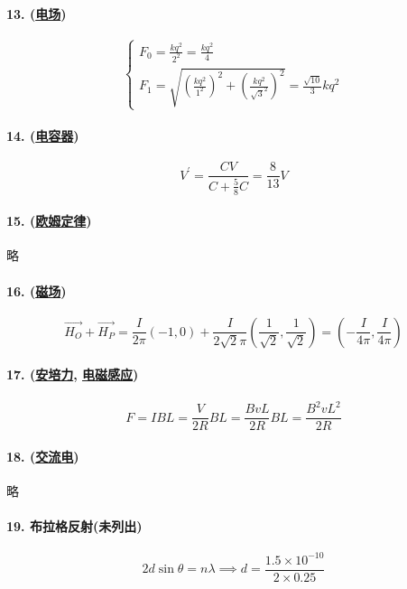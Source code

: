 \paragraph{13. (\hyperref[subsec:电场]{电场})}

\begin{equation*}
    \begin{cases}
        F_0=\frac{kq^2}{2^2}=\frac{kq^2}{4}\\
        F_1=\sqrt{\left(\frac{kq^2}{1^2}\right)^2+\left(\frac{kq^2}{\sqrt{3}^2}\right)^2}=\frac{\sqrt{10}}{3}kq^2
    \end{cases}
\end{equation*}

\paragraph{14. (\hyperref[subsec:电容器]{电容器})}

\begin{equation*}
    V^\prime=\frac{CV}{C+\frac58C}=\frac{8}{13}V
\end{equation*}

\paragraph{15. (\hyperref[subsec:欧姆定律]{欧姆定律})} 略

\paragraph{16. (\hyperref[subsec:磁场]{磁场})}

\begin{equation*}
    \vec{H_O}+\vec{H_P}=
    \frac{I}{2\pi}(-1,0)+\frac{I}{2\sqrt2\pi}\left(\frac{1}{\sqrt2},\frac{1}{\sqrt2}\right)=
    \left(-\frac{I}{4\pi},\frac{I}{4\pi}\right)
\end{equation*}

\paragraph{17. (\hyperref[subsec:安培力]{安培力}, \hyperref[subsec:电磁感应]{电磁感应})}

\begin{equation*}
    F=IBL=\frac{V}{2R}BL=\frac{BvL}{2R}BL=\frac{B^2vL^2}{2R}
\end{equation*}

\paragraph{18. (\hyperref[subsec:交流电]{交流电})} 略

\paragraph{19. 布拉格反射(未列出)}

\begin{equation*}
    2d\sin\theta=n\lambda\implies d=\frac{1.5\times10^{-10}}{2\times0.25}
\end{equation*}
